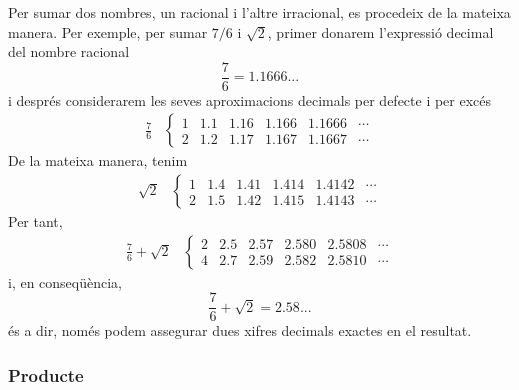 Per sumar dos nombres, un racional i l’altre irracional, es procedeix
de la mateixa manera. Per exemple, per sumar $7/6$ i $\sqrt{2}$, primer donarem
l’expressió decimal del nombre racional%
\begin{equation*}
\frac{7}{6}=1.1666...
\end{equation*}%
i després considerarem les seves aproximacions decimals per defecte i per
excés%
\begin{equation*}
\begin{array}{cc}
\frac{7}{6} & \left\{ 
\begin{array}{cccccc}
1 & 1.1 & 1.16 & 1.166 & 1.1666 & \cdots \\ 
2 & 1.2 & 1.17 & 1.167 & 1.1667 & \cdots%
\end{array}%
\right.%
\end{array}%
\end{equation*}%
De la mateixa manera, tenim%
\begin{equation*}
\begin{array}{cc}
\sqrt{2} & \left\{ 
\begin{array}{cccccc}
1 & 1.4 & 1.41 & 1.414 & 1.4142 & \cdots \\ 
2 & 1.5 & 1.42 & 1.415 & 1.4143 & \cdots%
\end{array}%
\right.%
\end{array}%
\end{equation*}%
Per tant,%
\begin{equation*}
\begin{array}{cc}
\frac{7}{6}+\sqrt{2} & \left\{ 
\begin{array}{cccccc}
2 & 2.5 & 2.57 & 2.580 & 2.5808 & \cdots \\ 
4 & 2.7 & 2.59 & 2.582 & 2.5810 & \cdots%
\end{array}%
\right.%
\end{array}%
\end{equation*}%
i, en conseqüència,%
\begin{equation*}
\frac{7}{6}+\sqrt{2}=2.58...
\end{equation*}%
és a dir, només podem assegurar dues xifres decimals exactes en el
resultat.

\subsubsection{Producte}

